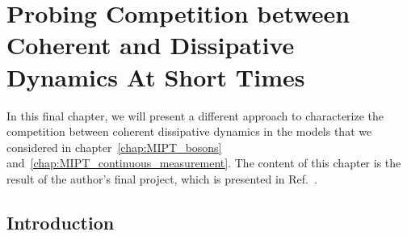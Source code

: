 \chapter{Probing Competition between Coherent and Dissipative Dynamics At Short Times}
\thispagestyle{empty}
\label{chap:short_time_dynamics}

In this final chapter, we will present a different approach to characterize the competition between coherent dissipative dynamics in the models that we considered in chapter~\ref{chap:MIPT_bosons} and~\ref{chap:MIPT_continuous_measurement}. The content of this chapter is the result of the author's final project, which is presented in Ref.~\cite{bintener2024}.

\section{Introduction}

